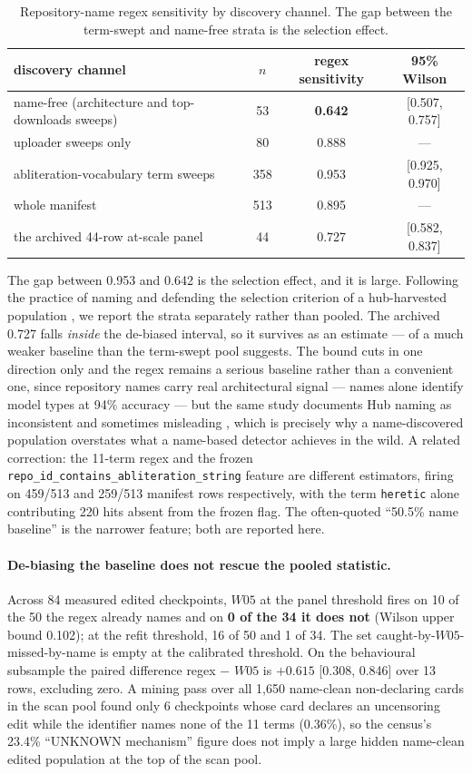 \documentclass[11pt,letterpaper]{article}
\begin{document}
\begin{table}[!htbp]
\centering
\caption{Repository-name regex sensitivity by discovery channel. The gap between the term-swept and name-free strata is the selection effect.}
\label{tab:name}
\begin{tabular}{lccc}
\toprule
discovery channel & $n$ & regex sensitivity & 95\% Wilson \\
\midrule
name-free (architecture and top-downloads sweeps) & 53 & \textbf{0.642} & [0.507, 0.757] \\
uploader sweeps only & 80 & 0.888 & --- \\
abliteration-vocabulary term sweeps & 358 & 0.953 & [0.925, 0.970] \\
whole manifest & 513 & 0.895 & --- \\
the archived 44-row at-scale panel & 44 & 0.727 & [0.582, 0.837] \\
\bottomrule
\end{tabular}
\end{table}

The gap between 0.953 and 0.642 is the selection effect, and it is large. Following the practice of naming and defending the selection criterion of a hub-harvested population \citep{Nikoli2025}, we report the strata separately rather than pooled. The archived 0.727 falls \emph{inside} the de-biased interval, so it survives as an estimate --- of a much weaker baseline than the term-swept pool suggests. The bound cuts in one direction only and the regex remains a serious baseline rather than a convenient one, since repository names carry real architectural signal --- names alone identify model types at 94\% accuracy --- but the same study documents Hub naming as inconsistent and sometimes misleading \citep{Jiang2023}, which is precisely why a name-discovered population overstates what a name-based detector achieves in the wild. A related correction: the 11-term regex and the frozen \texttt{repo\_id\_contains\_abliteration\_string} feature are different estimators, firing on 459/513 and 259/513 manifest rows respectively, with the term \texttt{heretic} alone contributing 220 hits absent from the frozen flag. The often-quoted ``50.5\% name baseline'' is the narrower feature; both are reported here.

\paragraph{De-biasing the baseline does not rescue the pooled statistic.} Across 84 measured edited checkpoints, $W05$ at the panel threshold fires on 10 of the 50 the regex already names and on \textbf{0 of the 34 it does not} (Wilson upper bound 0.102); at the refit threshold, 16 of 50 and 1 of 34. The set caught-by-$W05$-missed-by-name is empty at the calibrated threshold. On the behavioural subsample the paired difference regex $-$ $W05$ is $+0.615$ [0.308, 0.846] over 13 rows, excluding zero. A mining pass over all 1,650 name-clean non-declaring cards in the scan pool found only 6 checkpoints whose card declares an uncensoring edit while the identifier names none of the 11 terms (0.36\%), so the census's 23.4\% ``UNKNOWN mechanism'' figure does not imply a large hidden name-clean edited population at the top of the scan pool.
\end{document}
